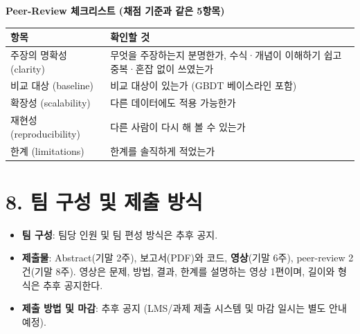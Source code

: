 \documentclass[12pt]{article}
\begin{document}
\vspace{4pt}
\noindent\textbf{Peer-Review 체크리스트 (채점 기준과 같은 5항목)}
\begin{center}
\small
\begin{tabular}{@{}ll@{}}
\toprule
항목 & 확인할 것 \\
\midrule
주장의 명확성 (clarity) & 무엇을 주장하는지 분명한가, 수식·개념이 이해하기 쉽고 중복·혼잡 없이 쓰였는가 \\
비교 대상 (baseline) & 비교 대상이 있는가 (GBDT 베이스라인 포함) \\
확장성 (scalability) & 다른 데이터에도 적용 가능한가 \\
재현성 (reproducibility) & 다른 사람이 다시 해 볼 수 있는가 \\
한계 (limitations) & 한계를 솔직하게 적었는가 \\
\bottomrule
\end{tabular}
\end{center}

\section*{8. 팀 구성 및 제출 방식}
\begin{itemize}
\item \textbf{팀 구성}: 팀당 인원 및 팀 편성 방식은 추후 공지.
\item \textbf{제출물}: Abstract(기말 2주), 보고서(PDF)와 코드, \textbf{영상}(기말 6주), peer-review 2건(기말 8주). 영상은 문제, 방법, 결과, 한계를 설명하는 영상 1편이며, 길이와 형식은 추후 공지한다.
\item \textbf{제출 방법 및 마감}: 추후 공지 (LMS/과제 제출 시스템
  및 마감 일시는 별도 안내 예정).
\end{itemize}
\end{document}
